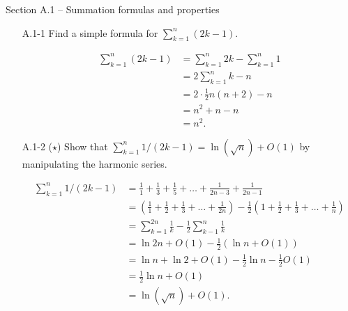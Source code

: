 
{\large Section A.1 {--} Summation formulas and properties}

\begin{enumerate}

\item[A.1{-}1] {Find a simple formula for $\sum_{k = 1}^{n} (2k - 1)$.}

\begin{framed}
\begin{equation*}
\begin{aligned}
  \sum_{k = 1}^{n} (2k - 1) &= \sum_{k = 1}^{n} 2k - \sum_{k = 1}^{n} 1\\
                            &= 2 \sum_{k = 1}^{n} k - n\\
                            &= 2 \cdot \frac{1}{2} n (n + 2) - n\\
                            &= n^2 + n - n\\
                            &= n^2.
\end{aligned}
\end{equation*}
\end{framed}

\item[A.1{-}2] {($\star$) Show that
$\sum_{k = 1}^{n} 1/(2k - 1) = \ln(\sqrt n) + O(1)$ by manipulating the harmonic
series.}

\begin{framed}
\begin{equation*}
\begin{aligned}
  \sum_{k = 1}^{n} 1/(2k - 1) &= \frac{1}{1} + \frac{1}{3} + \frac{1}{5} + \dots + \frac{1}{2n - 3} + \frac{1}{2n - 1}\\
                              &= \left(\frac{1}{1} + \frac{1}{2} + \frac{1}{3} + \dots + \frac{1}{2n}\right)
                              - \frac{1}{2} \left(1 + \frac{1}{2} + \frac{1}{3} + \dots + \frac{1}{n}\right)\\
                              &= \sum_{k = 1}^{2n} \frac{1}{k} - \frac{1}{2} \sum_{k - 1}^{n} \frac{1}{k}\\
                              &= \ln{2n} + O(1) - \frac{1}{2} (\ln n + O(1))\\
                              &= \ln n + \ln 2 + O(1) - \frac{1}{2} \ln n - \frac{1}{2} O(1)\\
                              &= \frac{1}{2} \ln n + O(1)\\
                              &= \ln(\sqrt n) + O(1).
\end{aligned}
\end{equation*}
\end{framed}


\end{enumerate}

